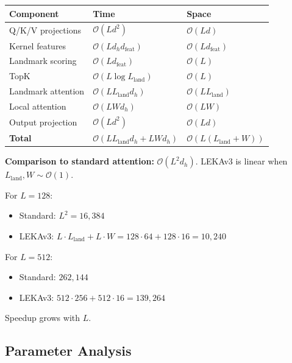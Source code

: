 \begin{table}[H]
\centering
\small
\begin{tabular}{lll}
\toprule
\textbf{Component} & \textbf{Time} & \textbf{Space} \\
\midrule
Q/K/V projections & $\mathcal{O}(L d^2)$ & $\mathcal{O}(L d)$ \\
Kernel features & $\mathcal{O}(L d_h d_\text{feat})$ & $\mathcal{O}(L d_\text{feat})$ \\
Landmark scoring & $\mathcal{O}(L d_\text{feat})$ & $\mathcal{O}(L)$ \\
TopK & $\mathcal{O}(L \log L_\text{land})$ & $\mathcal{O}(L)$ \\
Landmark attention & $\mathcal{O}(L L_\text{land} d_h)$ & $\mathcal{O}(L L_\text{land})$ \\
Local attention & $\mathcal{O}(L W d_h)$ & $\mathcal{O}(L W)$ \\
Output projection & $\mathcal{O}(L d^2)$ & $\mathcal{O}(L d)$ \\
\textbf{Total} & $\mathcal{O}(L L_\text{land} d_h + L W d_h)$ & $\mathcal{O}(L(L_\text{land} + W))$ \\
\bottomrule
\end{tabular}
\end{table}

\textbf{Comparison to standard attention:} $\mathcal{O}(L^2 d_h)$. LEKAv3 is linear 
when $L_\text{land}, W \sim \mathcal{O}(1)$.

For $L = 128$:
\begin{itemize}
\item Standard: $L^2 = 16{,}384$
\item LEKAv3: $L \cdot L_\text{land} + L \cdot W = 128 \cdot 64 + 128 \cdot 16 = 10{,}240$

\end{itemize}
For $L = 512$:
\begin{itemize}
\item Standard: $262{,}144$
\item LEKAv3: $512 \cdot 256 + 512 \cdot 16 = 139{,}264$

\end{itemize}
Speedup grows with $L$.

\subsection{Parameter Analysis}

